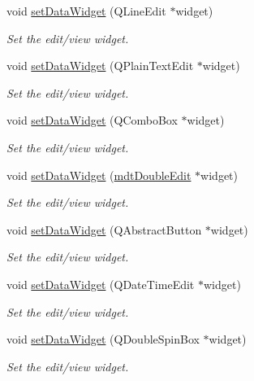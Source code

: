\begin{DoxyCompactItemize}
void \hyperlink{classmdt_sql_field_handler_ac326e3d22f67b1c6f76bb859e01dc486}{set\-Data\-Widget} (Q\-Line\-Edit $\ast$widget)
\begin{DoxyCompactList}\small\item\em Set the edit/view widget. \end{DoxyCompactList}\item 
void \hyperlink{classmdt_sql_field_handler_a2651da4daea5905e24aa3c8e084010b4}{set\-Data\-Widget} (Q\-Plain\-Text\-Edit $\ast$widget)
\begin{DoxyCompactList}\small\item\em Set the edit/view widget. \end{DoxyCompactList}\item 
void \hyperlink{classmdt_sql_field_handler_a87529d1cca340dcb267f27381f0f57c1}{set\-Data\-Widget} (Q\-Combo\-Box $\ast$widget)
\begin{DoxyCompactList}\small\item\em Set the edit/view widget. \end{DoxyCompactList}\item 
void \hyperlink{classmdt_sql_field_handler_a41e49170f58968dca09937962ae24302}{set\-Data\-Widget} (\hyperlink{classmdt_double_edit}{mdt\-Double\-Edit} $\ast$widget)
\begin{DoxyCompactList}\small\item\em Set the edit/view widget. \end{DoxyCompactList}\item 
void \hyperlink{classmdt_sql_field_handler_aa9a60be66471371ff52eb2a95989feba}{set\-Data\-Widget} (Q\-Abstract\-Button $\ast$widget)
\begin{DoxyCompactList}\small\item\em Set the edit/view widget. \end{DoxyCompactList}\item 
void \hyperlink{classmdt_sql_field_handler_abb528a4e0245d12308870556eefc934a}{set\-Data\-Widget} (Q\-Date\-Time\-Edit $\ast$widget)
\begin{DoxyCompactList}\small\item\em Set the edit/view widget. \end{DoxyCompactList}\item 
void \hyperlink{classmdt_sql_field_handler_a080380d84da12132783a8de9ad9fdf4c}{set\-Data\-Widget} (Q\-Double\-Spin\-Box $\ast$widget)
\begin{DoxyCompactList}\small\item\em Set the edit/view widget. \end{DoxyCompactList}\item 

\end{DoxyCompactItemize}
